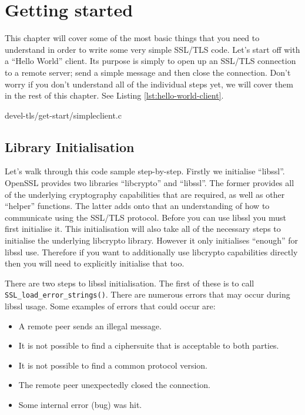 \chapter{Getting started}
This chapter will cover some of the most basic things that you need to 
understand in order to write some very simple SSL/TLS code. Let's start off with
a ``Hello World'' client. Its purpose is simply to open up an SSL/TLS
connection to a remote server; send a simple message and then close the
connection. Don't worry if you don't understand all of the individual steps yet,
we will cover them in the rest of this chapter. See Listing
\ref{lst:hello-world-client}.


{devel-tls/get-start/simpleclient.c}

\section{Library Initialisation}
\label{sec:getstart-library-init}

Let's walk through this code sample step-by-step. Firstly we initialise 
``libssl''. OpenSSL provides two libraries ``libcrypto'' and ``libssl''. The 
former provides all of the underlying cryptography capabilities that are 
required, as well as other ``helper'' functions. The latter adds onto that an
understanding of how to communicate using the SSL/TLS protocol. Before you can 
use libssl you must first initialise it. This initialisation will also take all 
of the necessary steps to initialise the underlying libcrypto library. However 
it only initialises ``enough'' for libssl use. Therefore if you want to 
additionally use libcrypto capabilities directly then you will need to 
explicitly initialise that too.

There are two steps to libssl initialisation. The first of these is to call 
\verb!SSL_load_error_strings()!. There are numerous errors that may occur 
during libssl usage. Some examples of errors that could occur are:
\begin{itemize}
\item A remote peer sends an illegal message.
\item It is not possible to find a ciphersuite that is acceptable to both 
parties.
\item It is not possible to find a common protocol version. 
\item The remote peer unexpectedly closed the connection.
\item Some internal error (bug) was hit.
\end{itemize}

